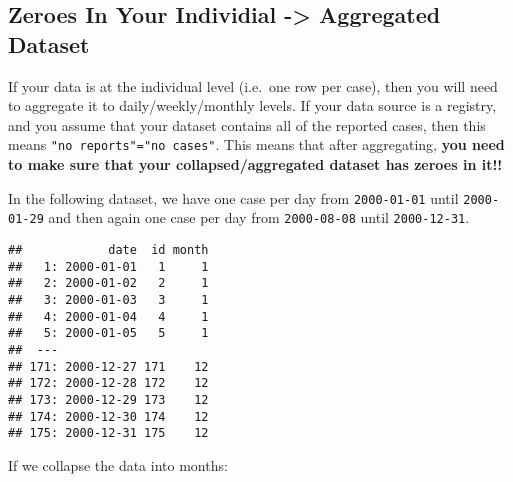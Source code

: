 \documentclass[]{book}
\newenvironment{Shaded}{\begin{snugshade}}{\end{snugshade}}
\newcommand{\KeywordTok}[1]{\textcolor[rgb]{0.13,0.29,0.53}{\textbf{#1}}}
\newcommand{\DataTypeTok}[1]{\textcolor[rgb]{0.13,0.29,0.53}{#1}}
\newcommand{\DecValTok}[1]{\textcolor[rgb]{0.00,0.00,0.81}{#1}}
\newcommand{\StringTok}[1]{\textcolor[rgb]{0.31,0.60,0.02}{#1}}
\newcommand{\OperatorTok}[1]{\textcolor[rgb]{0.81,0.36,0.00}{\textbf{#1}}}
\newcommand{\ErrorTok}[1]{\textcolor[rgb]{0.64,0.00,0.00}{\textbf{#1}}}
\newcommand{\NormalTok}[1]{#1}
\begin{document}
\subsection{Zeroes In Your Individial -\textgreater{} Aggregated
Dataset}\label{zeroes-in-your-individial---aggregated-dataset}

If your data is at the individual level (i.e.~one row per case), then
you will need to aggregate it to daily/weekly/monthly levels. If your
data source is a registry, and you assume that your dataset contains all
of the reported cases, then this means
\texttt{"no\ reports"="no\ cases"}. This means that after aggregating,
\textbf{you need to make sure that your collapsed/aggregated dataset has
zeroes in it!!}

In the following dataset, we have one case per day from
\texttt{2000-01-01} until \texttt{2000-01-29} and then again one case
per day from \texttt{2000-08-08} until \texttt{2000-12-31}.

\begin{Shaded}
\end{Shaded}

\begin{verbatim}
##            date  id month
##   1: 2000-01-01   1     1
##   2: 2000-01-02   2     1
##   3: 2000-01-03   3     1
##   4: 2000-01-04   4     1
##   5: 2000-01-05   5     1
##  ---                     
## 171: 2000-12-27 171    12
## 172: 2000-12-28 172    12
## 173: 2000-12-29 173    12
## 174: 2000-12-30 174    12
## 175: 2000-12-31 175    12
\end{verbatim}

If we collapse the data into months:
\end{document}
